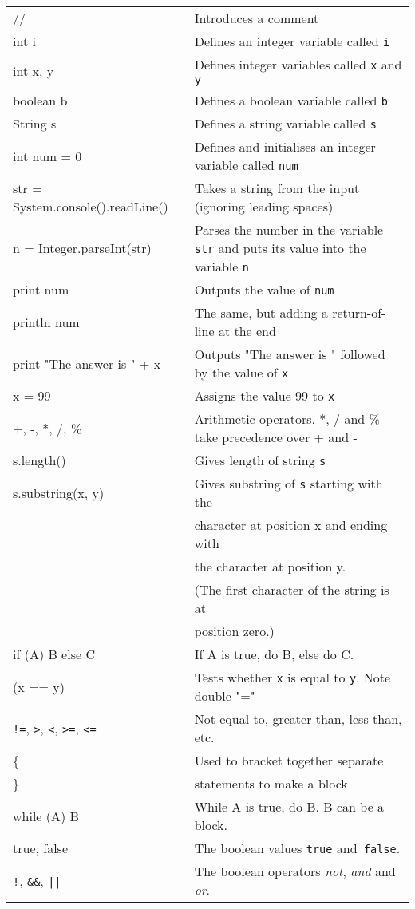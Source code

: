 
\begin{tabular}{p{6cm}p{7cm}}
// & Introduces a comment\\
int i & Defines an integer variable called \texttt{i}\\
int x, y & Defines integer variables called \texttt{x} and \texttt{y}\\
boolean b & Defines a boolean variable called \texttt{b}\\
String s & Defines a string variable called \texttt{s}\\
int num = 0 & Defines and initialises an integer variable called \texttt{num}\\
str = System.console().readLine() & Takes a string from the input
(ignoring leading spaces) \\
n = Integer.parseInt(str) & Parses the number in the variable
\texttt{str} and puts its value into the variable \texttt{n} \\
print num & Outputs the value of \texttt{num}\\
println num & The same, but adding a return-of-line at the end\\
print "The answer is " + x & Outputs "The answer is " followed by the value of \texttt{x}\\
x = 99 & Assigns the value 99 to \texttt{x}\\
+, -, *, /, \% & Arithmetic operators.  *, / and \% take precedence over + and -\\
s.length() & Gives length of string \texttt{s}\\
s.substring(x, y) & Gives substring of \texttt{s} starting with the \\
                  & character at position x and ending with \\
                  & the character at position y.\\
                  & (The first character of the string is at \\ 
                  & position zero.)\\
if (A) B else C   & If A is true, do B, else do C.\\
(x == y)          & Tests whether \texttt{x} is equal to \texttt{y}.  Note double "="\\
\verb+!=+, \verb+>+, \verb+<+, \verb+>=+, \verb+<=+ 
                  & Not equal to, greater than, less than, etc.\\
\{ & Used to bracket together separate \\ 
\} & statements to make a block\\
while (A) B & While A is true, do B.  B can be a block.\\
true, false & The boolean values \texttt{true} and\texttt{ false}.\\
\verb+!+, \verb+&&+, \verb+||+  & The boolean operators \emph{not}, \emph{and} and \emph{or}.\\
\end{tabular}
\vspace*{5pt}



